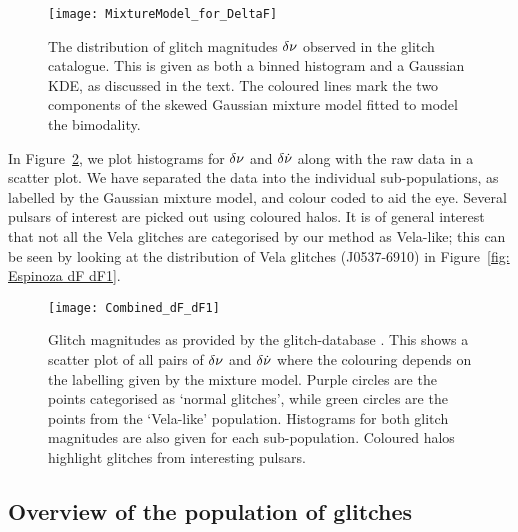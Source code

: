 \documentclass[../full_thesis/full_thesis.tex]{subfiles}
\begin{document}
\begin{figure}[htb]
\centering
\texttt{[image: MixtureModel\_for\_DeltaF]}
\caption{The distribution of glitch magnitudes $\delta\nu$ observed in the
glitch catalogue. This is given as both a binned histogram and a Gaussian
KDE, as discussed in the text. The coloured lines mark the two components of
the skewed Gaussian mixture model fitted to model the bimodality.}
\label{fig: Delta nu mixture}
\end{figure}

In Figure~\ref{fig: Espinoza dF dF1}, we plot histograms for $\delta\nu$ and
$\delta\dot{\nu}$ along with the raw data in a scatter plot. We have separated
the data into the individual sub-populations, as labelled by the Gaussian
mixture model, and colour coded to aid the eye. Several pulsars of interest are
picked out using coloured halos. It is of general interest that not all the
Vela glitches are categorised by our method as Vela-like; this can be seen by
looking at the distribution of Vela glitches (J0537-6910) in Figure~\ref{fig:
Espinoza dF dF1}.
\begin{figure*}[htb]
\centering
\texttt{[image: Combined\_dF\_dF1]}
\caption{Glitch magnitudes as provided by the glitch-database
         \citep{Espinoza2011}. This shows a scatter plot of all pairs of
         $\delta\nu$ and $\delta\dot{\nu}$ where the colouring depends on the
         labelling given by the mixture model. Purple circles are the
         points categorised as `normal glitches', while green
         circles are the points from the `Vela-like' population. Histograms for
         both glitch magnitudes are also given for each sub-population.
         Coloured halos highlight glitches from interesting pulsars.}
\label{fig: Espinoza dF dF1}
\end{figure*}


\subsection{Overview of the population of glitches}
\label{sec: overview of the population of glitches}
\end{document}
